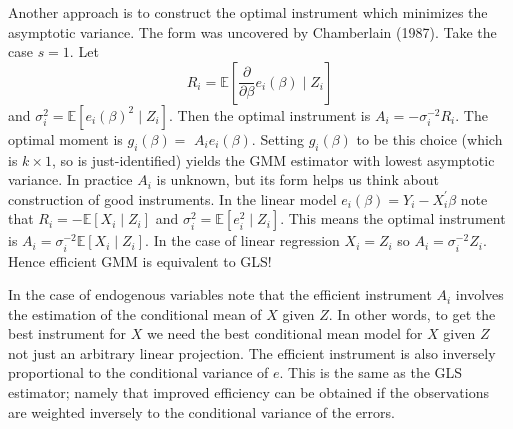 \documentclass[10pt]{article}
\begin{document}
Another approach is to construct the optimal instrument which minimizes the asymptotic variance. The form was uncovered by Chamberlain (1987). Take the case $s=1$. Let
$$
R_{i}=\mathbb{E}\left[\frac{\partial}{\partial \beta} e_{i}(\beta) \mid Z_{i}\right]
$$
and $\sigma_{i}^{2}=\mathbb{E}\left[e_{i}(\beta)^{2} \mid Z_{i}\right]$. Then the optimal instrument is $A_{i}=-\sigma_{i}^{-2} R_{i}$. The optimal moment is $g_{i}(\beta)=$ $A_{i} e_{i}(\beta)$. Setting $g_{i}(\beta)$ to be this choice (which is $k \times 1$, so is just-identified) yields the GMM estimator with lowest asymptotic variance. In practice $A_{i}$ is unknown, but its form helps us think about construction of good instruments. In the linear model $e_{i}(\beta)=Y_{i}-X_{i}^{\prime} \beta$ note that $R_{i}=-\mathbb{E}\left[X_{i} \mid Z_{i}\right]$ and $\sigma_{i}^{2}=\mathbb{E}\left[e_{i}^{2} \mid Z_{i}\right]$. This means the optimal instrument is $A_{i}=\sigma_{i}^{-2} \mathbb{E}\left[X_{i} \mid Z_{i}\right]$. In the case of linear regression $X_{i}=Z_{i}$ so $A_{i}=\sigma_{i}^{-2} Z_{i}$. Hence efficient GMM is equivalent to GLS!

In the case of endogenous variables note that the efficient instrument $A_{i}$ involves the estimation of the conditional mean of $X$ given $Z$. In other words, to get the best instrument for $X$ we need the best conditional mean model for $X$ given $Z$ not just an arbitrary linear projection. The efficient instrument is also inversely proportional to the conditional variance of $e$. This is the same as the GLS estimator; namely that improved efficiency can be obtained if the observations are weighted inversely to the conditional variance of the errors.
\end{document}
